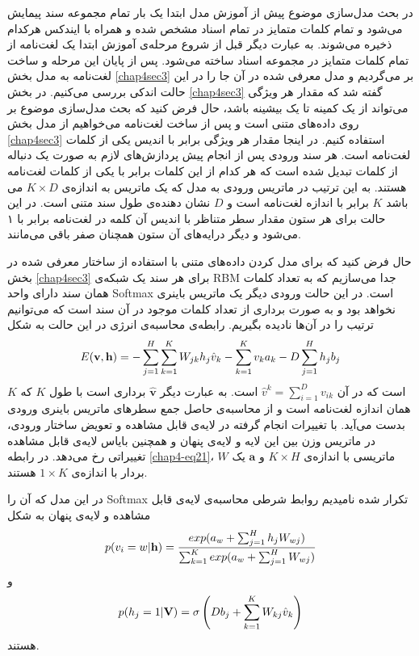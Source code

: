 در بحث مدل‌سازی موضوع پیش از آموزش مدل ابتدا یک بار تمام مجموعه سند پیمایش می‌‌شود و تمام کلمات متمایز در تمام اسناد مشخص شده و همراه با ایندکس هرکدام ذخیره می‌‌شوند. به عبارت دیگر قبل از شروع مرحله‌ی آموزش ابتدا یک لغت‌نامه از تمام کلمات متمایز در مجموعه اسناد ساخته می‌‌شود. پس از پایان این مرحله و ساخت لغت‌نامه به مدل بخش
\ref{chap4sec3}
بر می‌‌گردیم و مدل معرفی‌ شده در آن جا را در این حالت اندکی‌ بررسی‌ می‌‌کنیم. در بخش
\ref{chap4sec3}
گفته شد که مقدار هر ویژگی‌ می‌‌تواند از یک کمینه تا یک بیشینه باشد، حال فرض کنید که بحث مدل‌سازی موضوع بر روی داده‌های متنی است و پس از ساخت لغت‌نامه می‌خواهیم از مدل بخش
\ref{chap4sec3}
استفاده کنیم. در اینجا مقدار هر ویژگی‌ برابر با اندیس یکی‌ از کلمات لغت‌نامه است. هر سند ورودی پس از انجام پیش پردازش‌های لازم به صورت یک دنباله از کلمات تبدیل شده است که هر کدام از این کلمات برابر با یکی‌ از کلمات لغت‌نامه هستند. به این ترتیب در ماتریس ورودی به مدل که یک ماتریس به انداز‌ه‌ی
$K \times D$
می‌ باشد
$K$
برابر با اندازه لغت‌نامه است و
$D$
نشان دهنده‌ی طول سند متنی است. در این حالت برای هر ستون مقدار سطر متناظر با اندیس آن کلمه در لغت‌نامه برابر با ۱ می‌‌شود و دیگر درایه‌های آن ستون همچنان صفر باقی‌ می‌‌مانند.

حال فرض کنید که برای مدل کردن داده‌های متنی با استفاده از ساختار معرفی‌ شده در بخش
\ref{chap4sec3}
برای هر سند یک شبکه‌ی
RBM
جدا می‌‌سازیم که به تعداد کلمات همان سند دارای واحد
Softmax
است. در این حالت ورودی دیگر یک ماتریس باینری نخواهد بود و به صورت برداری از تعداد کلمات موجود در آن سند است که می‌‌توانیم ترتیب را در آن‌ها نادیده بگیریم. رابطه‌ی محاسبه‌ی انرژی در این حالت به شکل
\begin{align}
	\centering
	\label{chap4-eq21}
	E(\textbf{v},\textbf{h})=-\sum_{j=1}^{H}\sum_{k=1}^{K}W_{jk}h_j\hat{v}_{k}-\sum_{k=1}^{K}v_{k}a_{k} - D\sum_{j=1}^{H}h_jb_j
	\end{align}
است که در آن
$\hat{v}^k = \sum_{i=1}^{D}v_{ik}$
است. به عبارت دیگر
$\hat{\textbf{v}}$
برداری است با طول
$K$
که 
$K$
همان اندازه لغت‌نامه است و از محاسبه‌ی حاصل جمع سطر‌های ماتریس باینری ورودی بدست می‌‌آید.
با تغییرات انجام گرفته در لایه‌ی قابل مشاهده و تعویض ساختار ورودی، در ماتریس وزن بین این لایه و لایه‌ی پنهان و همچنین بایاس لایه‌ی قابل مشاهده تغییراتی‌ رخ می‌‌دهد. در رابطه
\ref{chap4-eq21}، $W$
ماتریسی با اندازه‌ی
$K \times H$
و
$\textbf{a}$
یک بردار با اندازه‌ی
$1 \times K$
هستند.

در این مدل که آن را
Softmax
تکرار شده نامیدیم روابط شرطی محاسبه‌ی لایه‌ی قابل مشاهده و لایه‌ی پنهان به شکل
\begin{align}
	\centering
	\label{chap4-eq22}
	p(v_{i}=w|\textbf{h})=\dfrac{exp(a_{w}+\sum_{j=1}^{H}h_jW_{wj})}{\sum_{k=1}^{K}exp(a_{w}+\sum_{j=1}^{H}W_{wj})}
	\end{align}
و
\begin{align}
	\centering
	\label{chap4-eq23}
	p(h_{j}=1|\textbf{V})=\sigma \left( Db_j + \sum_{k=1}^{K}W_{kj}\hat{v}_k \right)
\end{align}
هستند.

